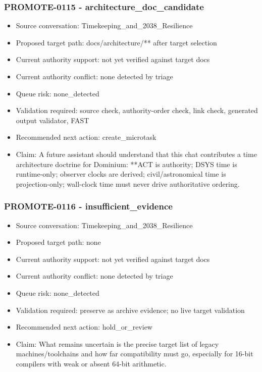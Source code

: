 \documentclass[11pt,a4paper]{report}
\begin{document}
\subsubsection{PROMOTE-0115 - architecture\_doc\_candidate}

\begin{itemize}
\item Source conversation: Timekeeping\_and\_2038\_Resilience
\item Proposed target path: docs/architecture/** after target selection
\item Current authority support: not yet verified against target docs
\item Current authority conflict: none detected by triage
\item Queue risk: none\_detected
\item Validation required: source check, authority-order check, link check, generated output validator, FAST
\item Recommended next action: create\_microtask
\item Claim: A future assistant should understand that this chat contributes a time architecture doctrine for Dominium: **ACT is authority; DSYS time is runtime-only; observer clocks are derived; civil/astronomical time is projection-only; wall-clock time must never drive authoritative ordering.
\end{itemize}

\subsubsection{PROMOTE-0116 - insufficient\_evidence}

\begin{itemize}
\item Source conversation: Timekeeping\_and\_2038\_Resilience
\item Proposed target path: none
\item Current authority support: not yet verified against target docs
\item Current authority conflict: none detected by triage
\item Queue risk: none\_detected
\item Validation required: preserve as archive evidence; no live target validation
\item Recommended next action: hold\_or\_review
\item Claim: What remains uncertain is the precise target list of legacy machines/toolchains and how far compatibility must go, especially for 16-bit compilers with weak or absent 64-bit arithmetic.
\end{itemize}
\end{document}
